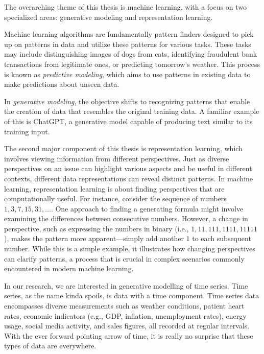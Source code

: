 \documentclass[../../thesis.tex]{subfiles}
\begin{document}
The overarching theme of this thesis is machine learning, with a focus on two specialized areas: generative modeling and representation learning.\newline

Machine learning algorithms are fundamentally pattern finders designed to pick up on patterns in data and utilize these patterns for various tasks. These tasks may include distinguishing images of dogs from cats, identifying fraudulent bank transactions from legitimate ones, or predicting tomorrow's weather. This process is known as \textit{predictive modeling}, which aims to use patterns in existing data to make predictions about unseen data.\newline

In \textit{generative modeling}, the objective shifts to recognizing patterns that enable the creation of data that resembles the original training data. A familiar example of this is ChatGPT, a generative model capable of producing text similar to its training input.\newline


The second major component of this thesis is representation learning, which involves viewing information from different perspectives. Just as diverse perspectives on an issue can highlight various aspects and be useful in different contexts, different data representations can reveal distinct patterns. In machine learning, representation learning is about finding perspectives that are computationally useful. For instance, consider the sequence of numbers $1, 3, 7, 15, 31, \dots$. One approach to finding a generating formula might involve examining the differences between consecutive numbers. However, a change in perspective, such as expressing the numbers in binary (i.e., $1, 11, 111, 1111, 11111$), makes the pattern more apparent—simply add another $1$ to each subsequent number. While this is a simple example, it illustrates how changing perspectives can clarify patterns, a process that is crucial in complex scenarios commonly encountered in modern machine learning.\newline

In our research, we are interested in generative modelling of time series. Time series, as the name kinda spoils, is data with a time component. Time series data encompasses diverse measurements such as weather conditions, patient heart rates, economic indicators (e.g., GDP, inflation, unemployment rates), energy usage, social media activity, and sales figures, all recorded at regular intervals. With the ever forward pointing arrow of time, it is really no surprise that these types of data are everywhere. \newline
\end{document}
